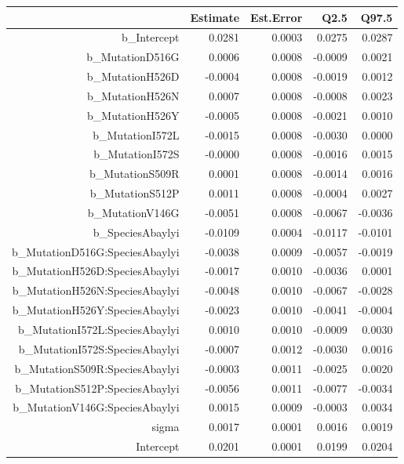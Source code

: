 


\begin{table}[ht]
\centering
\begin{tabular}{rrrrr}
  \hline
 & Estimate & Est.Error & Q2.5 & Q97.5 \\ 
  \hline
b\_Intercept & 0.0281 & 0.0003 & 0.0275 & 0.0287 \\ 
  b\_MutationD516G & 0.0006 & 0.0008 & -0.0009 & 0.0021 \\ 
  b\_MutationH526D & -0.0004 & 0.0008 & -0.0019 & 0.0012 \\ 
  b\_MutationH526N & 0.0007 & 0.0008 & -0.0008 & 0.0023 \\ 
  b\_MutationH526Y & -0.0005 & 0.0008 & -0.0021 & 0.0010 \\ 
  b\_MutationI572L & -0.0015 & 0.0008 & -0.0030 & 0.0000 \\ 
  b\_MutationI572S & -0.0000 & 0.0008 & -0.0016 & 0.0015 \\ 
  b\_MutationS509R & 0.0001 & 0.0008 & -0.0014 & 0.0016 \\ 
  b\_MutationS512P & 0.0011 & 0.0008 & -0.0004 & 0.0027 \\ 
  b\_MutationV146G & -0.0051 & 0.0008 & -0.0067 & -0.0036 \\ 
  b\_SpeciesAbaylyi & -0.0109 & 0.0004 & -0.0117 & -0.0101 \\ 
  b\_MutationD516G:SpeciesAbaylyi & -0.0038 & 0.0009 & -0.0057 & -0.0019 \\ 
  b\_MutationH526D:SpeciesAbaylyi & -0.0017 & 0.0010 & -0.0036 & 0.0001 \\ 
  b\_MutationH526N:SpeciesAbaylyi & -0.0048 & 0.0010 & -0.0067 & -0.0028 \\ 
  b\_MutationH526Y:SpeciesAbaylyi & -0.0023 & 0.0010 & -0.0041 & -0.0004 \\ 
  b\_MutationI572L:SpeciesAbaylyi & 0.0010 & 0.0010 & -0.0009 & 0.0030 \\ 
  b\_MutationI572S:SpeciesAbaylyi & -0.0007 & 0.0012 & -0.0030 & 0.0016 \\ 
  b\_MutationS509R:SpeciesAbaylyi & -0.0003 & 0.0011 & -0.0025 & 0.0020 \\ 
  b\_MutationS512P:SpeciesAbaylyi & -0.0056 & 0.0011 & -0.0077 & -0.0034 \\ 
  b\_MutationV146G:SpeciesAbaylyi & 0.0015 & 0.0009 & -0.0003 & 0.0034 \\ 
  sigma & 0.0017 & 0.0001 & 0.0016 & 0.0019 \\ 
  Intercept & 0.0201 & 0.0001 & 0.0199 & 0.0204 \\ 

\end{tabular}
\end{table}
